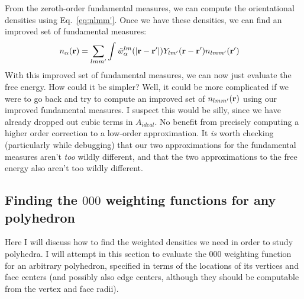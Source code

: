 \documentclass[letterpaper,twocolumn,amsmath,amssymb,pre]{revtex4-1}
\begin{document}
From the zeroth-order fundamental measures, we can
compute the orientational densities using Eq.~\ref{eq:nlmm'}.  Once we
have these densities, we can find an improved set of fundamental
measures:
\begin{align}
  n_\alpha(\mathbf{r}) &= \sum_{lmm'} \int
  \tilde{w}_\alpha^{lm}(|\mathbf{r}-\mathbf{r}'|) Y_{lm'}(\mathbf{r}-\mathbf{r}')n_{lmm'}(\mathbf{r}')
\end{align}
With this improved set of fundamental measures, we can now just
evaluate the free energy.  How could it be simpler? Well, it could be
more complicated if we were to go back and try to compute an improved
set of $n_{lmm'}(\mathbf{r})$ using our improved fundamental measures.  I
suspect this would be silly, since we have already dropped out cubic
terms in $A_{\textit{ideal}}$.  No benefit from precisely computing a
higher order correction to a low-order approximation.  It \emph{is}
worth checking (particularly while debugging) that our two
approximations for the fundamental measures aren't \emph{too} wildly
different, and that the two approximations to the free energy also
aren't too wildly different.

\subsection{Finding the $000$ weighting functions for any polyhedron}

\newcommand\xhat{\mathbf{\hat{x}}}
\newcommand\yhat{\mathbf{\hat{y}}}
\newcommand\zhat{\mathbf{\hat{z}}}
\newcommand\facehat{\mathbf{\hat{f}}}
\newcommand\Rface{\ensuremath{R_f}}
\newcommand\Rvertex{\ensuremath{R_v}}

Here I will discuss how to find the weighted densities we need in
order to study polyhedra.  I will attempt in this section to evaluate
the $000$ weighting function for an arbitrary polyhedron, specified in
terms of the locations of its vertices and face centers (and possibly
also edge centers, although they should be computable from the vertex
and face radii).
\end{document}
